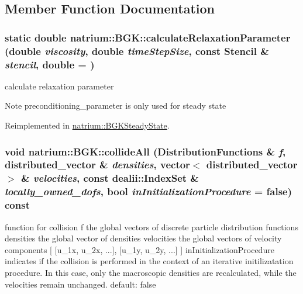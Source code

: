 \subsection{Member Function Documentation}
\hypertarget{classnatrium_1_1BGK_a430f5020b6101a64d89a0cc2a246260e}{
\subsubsection[{calculateRelaxationParameter}]{\setlength{\rightskip}{0pt plus 5cm}static double natrium::BGK::calculateRelaxationParameter (double {\em viscosity}, \/  double {\em timeStepSize}, \/  const {\bf Stencil} \& {\em stencil}, \/  double = {})}}
\label{classnatrium_1_1BGK_a430f5020b6101a64d89a0cc2a246260e}


calculate relaxation parameter \begin{DoxyNote}{Note}
preconditioning\_\-parameter is only used for steady state 
\end{DoxyNote}


Reimplemented in \hyperlink{classnatrium_1_1BGKSteadyState_a2cd6628c71475663e204656147de99b8}{natrium::BGKSteadyState}.\hypertarget{classnatrium_1_1BGK_a9fa1c980217a183fc4762954e86ba36d}{
\subsubsection[{collideAll}]{\setlength{\rightskip}{0pt plus 5cm}void natrium::BGK::collideAll ({\bf DistributionFunctions} \& {\em f}, \/  {\bf distributed\_\-vector} \& {\em densities}, \/  vector$<$ {\bf distributed\_\-vector} $>$ \& {\em velocities}, \/  const dealii::IndexSet \& {\em locally\_\-owned\_\-dofs}, \/  bool {\em inInitializationProcedure} = {\ttfamily false}) const}}
\label{classnatrium_1_1BGK_a9fa1c980217a183fc4762954e86ba36d}


function for collision f the global vectors of discrete particle distribution functions densities the global vector of densities velocities the global vectors of velocity components \mbox{[} \mbox{[}u\_\-1x, u\_\-2x, ...\mbox{]}, \mbox{[}u\_\-1y, u\_\-2y, ...\mbox{]} \mbox{]} inInitializationProcedure indicates if the collision is performed in the context of an iterative initilizatation procedure. In this case, only the macroscopic densities are recalculated, while the velocities remain unchanged. default: false 

